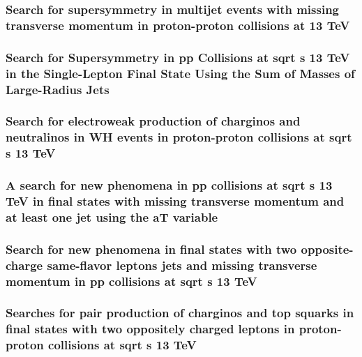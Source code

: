 \documentclass[a4paper, 11pt, twoside, openright]{report}
\begin{document}
\subsubsection{Search for supersymmetry in multijet events with missing transverse momentum in proton-proton collisions at 13 TeV}
%
\subsubsection{Search for Supersymmetry in pp Collisions at sqrt s 13 TeV in the Single-Lepton Final State Using the Sum of Masses of Large-Radius Jets}
%
\subsubsection{Search for electroweak production of charginos and neutralinos in WH events in proton-proton collisions at sqrt s 13 TeV}
%
\subsubsection{A search for new phenomena in pp collisions at sqrt s 13 TeV in final states with missing transverse momentum and at least one jet using the aT variable}
%
\subsubsection{Search for new phenomena in final states with two opposite-charge same-flavor leptons jets and missing transverse momentum in pp collisions at sqrt s 13 TeV}
%
\subsubsection{Searches for pair production of charginos and top squarks in final states with two oppositely charged leptons in proton-proton collisions at sqrt s 13 TeV}
%
\end{document}
